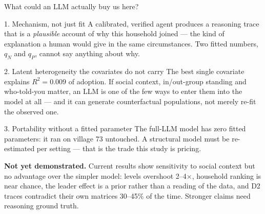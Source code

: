 \documentclass[aspectratio=169,10pt]{beamer}
\newcommand{\hl}[1]{\textcolor{mLightBrown}{#1}}
\newcommand{\srcnote}[1]{{\tiny\color{gray}#1}}
\begin{document}
\begin{frame}{What could an LLM actually buy us here?}
  \begin{block}{1. Mechanism, not just fit}
    \scriptsize
    A calibrated, verified agent produces a reasoning trace that is a
    \emph{plausible} account of why this household joined --- the kind of
    explanation a human would give in the same circumstances. Two fitted numbers,
    $q_N$ and $q_P$, cannot say anything about why.
  \end{block}
  \begin{block}{2. Latent heterogeneity the covariates do not carry}
    \scriptsize
    The best single covariate explains $R^2=0.009$ of adoption. If social
    context, in/out-group standing and who-told-you matter, an LLM is one of the
    few ways to enter them into the model at all --- and it can generate
    counterfactual populations, not merely re-fit the observed one.
  \end{block}
  \begin{block}{3. Portability without a fitted parameter}
    \scriptsize
    The full-LLM model has \hl{zero fitted parameters}: it ran on village 73
    untouched. A structural model must be re-estimated per setting --- that is
    the trade this study is pricing.
  \end{block}
  \vfill
  \srcnote{\textbf{Not yet demonstrated.} Current results show sensitivity to
    social context but \hl{no advantage over the simpler model}: levels overshoot
    2--4$\times$, household ranking is near chance, the leader effect is a prior
    rather than a reading of the data, and D2 traces contradict their own
    matrices 30--45\% of the time. Stronger claims need reasoning ground truth.}
\end{frame}
\end{document}
